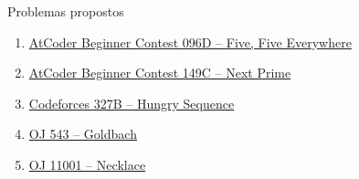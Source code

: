 \begin{frame}[fragile]{Problemas propostos}

    \begin{enumerate}
        \item \href{https://atcoder.jp/contests/abc096/tasks/abc096_d}{AtCoder Beginner Contest 096D -- Five, Five Everywhere}
        \item \href{https://atcoder.jp/contests/abc149/tasks/abc149_c}{AtCoder Beginner Contest 149C -- Next Prime}
        \item \href{https://codeforces.com/problemset/problem/327/B}{Codeforces 327B -- Hungry Sequence}
        \item \href{http://onlinejudge.org/index.php?option=com_onlinejudge&Itemid=8&category=24&page=show_problem&problem=484}{OJ 543 -- Goldbach}
        \item \href{http://uva.onlinejudge.org/index.php?option=com_onlinejudge&Itemid=8&category=24&page=show_problem&problem=1942}{OJ 11001 -- Necklace}
    \end{enumerate}

\end{frame}
